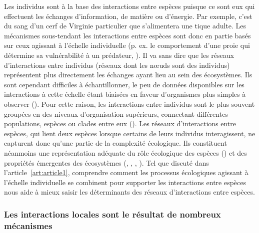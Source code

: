 Les individus sont à la base des interactions entre espèces puisque ce sont eux
qui effectuent les échanges d'information, de matière ou d'énergie. Par exemple,
c'est du sang d'un cerf de Virginie particulier que s'alimentera une tique
adulte. Les mécanismes sous-tendant les interactions entre espèces sont donc en
partie basés sur ceux agissant à l'échelle individuelle (p. ex. le comportement
d'une proie qui détermine sa vulnérabilité à un prédateur,
\cite{Choh2012Predatorprey}). Il va sans dire que les réseaux d'interactions
entre individus (réseaux dont les nœuds sont des individus) représentent plus
directement les échanges ayant lieu au sein des écosystèmes. Ils sont cependant
difficiles à échantillonner, le peu de données disponibles sur les interactions
à cette échelle étant biaisées en faveur d'organismes plus simples à observer
(\cite{Guimaraes2020Structure}). Pour cette raison, les interactions entre
individus sont le plus souvent groupées en des niveaux d'organisation
supérieurs, connectant différentes populations, espèces ou clades entre eux
(\cite{Elton1927Animal}). Les réseaux d'interactions entre espèces, qui lient
deux espèces lorsque certains de leurs individus interagissent, ne capturent
donc qu'une partie de la complexité écologique. Ils constituent néanmoins une
représentation adéquate du rôle écologique des espèces
(\cite{Delmas2019Analysing}) et des propriétés émergentes des écosystèmes
(\cite{Loreau2010Populations}, \cite{McCann2011Food},
\cite{Bascompte2013Mutualistic}, \cite{Gonzalez2020Scalingup}). Tel que discuté
dans l'article~\ref{art:article1}, comprendre comment les processus écologiques
agissant à l'échelle individuelle se combinent pour supporter les interactions
entre espèces nous aide à mieux saisir les déterminants des réseaux
d'interactions entre espèces.

\subsubsection{Les interactions locales sont le résultat de nombreux mécanismes} 

